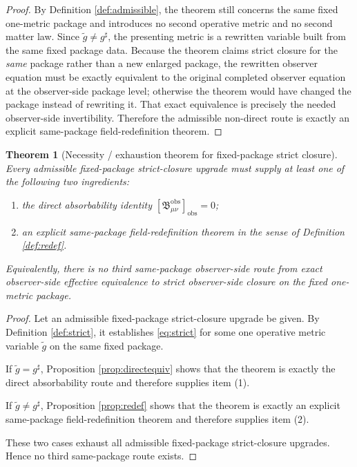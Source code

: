 \documentclass[11pt]{article}
\newcommand{\CompletedMetric}{g^{\sharp}}
\newcommand{\PresentedMetric}{\widetilde g}
\newcommand{\ObsBurden}{\mathfrak B_{\mu\nu}^{\mathrm{obs}}}
\newcommand{\ObserverClass}[1]{\left[#1\right]_{\mathrm{obs}}}
\newtheorem{theorem}{Theorem}
\begin{document}
\begin{proof}
By Definition \ref{def:admissible}, the theorem still concerns the same fixed one-metric package and introduces no second operative metric and no second matter law. Since \(\PresentedMetric\neq\CompletedMetric\), the presenting metric is a rewritten variable built from the same fixed package data. Because the theorem claims strict closure for the \emph{same} package rather than a new enlarged package, the rewritten observer equation must be exactly equivalent to the original completed observer equation at the observer-side package level; otherwise the theorem would have changed the package instead of rewriting it. That exact equivalence is precisely the needed observer-side invertibility. Therefore the admissible non-direct route is exactly an explicit same-package field-redefinition theorem.
\end{proof}

\begin{theorem}[Necessity / exhaustion theorem for fixed-package strict closure]
\label{thm:necessity}
Every admissible fixed-package strict-closure upgrade must supply at least one of the following two ingredients:
\begin{enumerate}
    \item the direct absorbability identity \(\ObserverClass{\ObsBurden}=0\);
    \item an explicit same-package field-redefinition theorem in the sense of Definition \ref{def:redef}.
\end{enumerate}
Equivalently, there is no third same-package observer-side route from exact observer-side effective equivalence to strict observer-side closure on the fixed one-metric package.
\end{theorem}

\begin{proof}
Let an admissible fixed-package strict-closure upgrade be given. By Definition \ref{def:strict}, it establishes \eqref{eq:strict} for some one operative metric variable \(\PresentedMetric\) on the same fixed package.

If \(\PresentedMetric=\CompletedMetric\), Proposition \ref{prop:directequiv} shows that the theorem is exactly the direct absorbability route and therefore supplies item (1).

If \(\PresentedMetric\neq\CompletedMetric\), Proposition \ref{prop:redef} shows that the theorem is exactly an explicit same-package field-redefinition theorem and therefore supplies item (2).

These two cases exhaust all admissible fixed-package strict-closure upgrades. Hence no third same-package route exists.
\end{proof}
\end{document}
